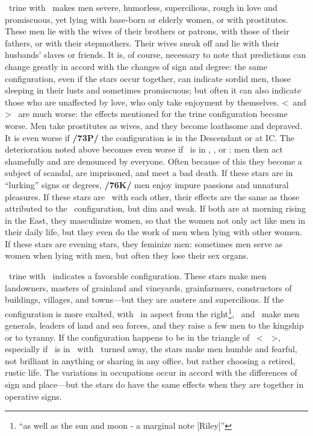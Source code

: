 \Venus\, \marginnote{\Venus \Trine \Saturn} trine with \Saturn\, makes men severe, humorless, supercilious, rough in love and promiscuous, yet lying with base-born or elderly women, or with prostitutes. These men lie with the wives of their brothers or patrons, with those of their fathers, or with their stepmothers. Their wives sneak off and lie with their husbands’ slaves or friends. \mndl It is, of course, necessary to note that predictions can change greatly
in accord with the changes of sign and degree: the same configuration, even if the stars occur together, can
indicate sordid men, those sleeping in their lusts and sometimes promiscuous; but often it can also indicate those who are unaffected by love, who only take enjoyment by themselves. <\Venus\, and \Saturn> \Square\, are much worse: the effects mentioned for the trine configuration become worse. Men take prostitutes as wives, and they become loathsome and depraved. It is even worse if \textbf{/73P/} the configuration is in the Descendant or at IC. The deterioration noted above becomes even worse if \Mars\, is in \Conjunction, \Square, or \Opposition: men then act shamefully and are denounced by everyone. Often because of this they become a subject of scandal, are imprisoned, and meet a bad death. If these stars are in “lurking” signs or degrees, \textbf{/76K/} men enjoy impure passions and unnatural pleasures. If these stars are \Sextile\, with each other, their effects are the same as those attributed to the \Trine\, configuration, but dim and weak. If both are at morning rising in the East, they masculinize women, so that the women not only act like men in their daily life, but they even do the work of men when lying with other women. If these stars are evening stars, they feminize men: sometimes men serve as women when lying with men, but often they lose their sex organs.

\Saturn\, \marginnote{\Saturn \Trine \Jupiter} trine with \Jupiter\, indicates a favorable configuration. These stars make men landowners, masters of grainland and vineyards, grainfarmers, constructors of buildings, villages, and towns—but they are austere and supercilious. If the configuration is more exalted, with \Mars\, in aspect from the right\footnote{``as well as the sun and moon - a marginal note [Riley]''}, \Saturn\, and \Jupiter\, make men generals, leaders of land and sea forces, and they raise a few men to the
kingship or to tyranny. If the configuration happens to be in the triangle of \Saturn\, <\Gemini\, \Libra\, \Aquarius>, especially if \Jupiter\, is in \Aquarius\, with \Mars\, turned away, the stars make men humble and fearful, not brilliant in anything or sharing in any office, but rather choosing a retired, rustic life. \mndl The variations in occupations occur in accord with the differences of sign and place—but the stars do have the same effects when they are together in operative signs.

